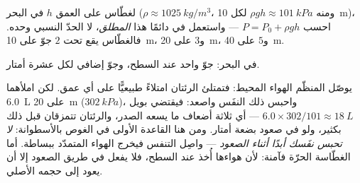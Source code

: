 \begin{method}\label{met:g10:pressure:dive}
لغطّاس على العمق $h$ في البحر ($\rho \approx \qty{1025}{kg/m^3}$،
ومنه $\rho g h \approx \qty{101}{kPa}$ لكل \qty{10}{m})، احسب
$P = P_0 + \rho g h$ --- واستعمل في  دائمًا هذا 
\emph{المطلق}، لا الحدّ النسبي وحده. فالغطّاس يقع
تحت $2$ جوّ على \qty{10}{m}، و$3$ على \qty{20}{m}، و$5$ على
\qty{40}{m}.
\end{method}

\begin{omfigure}

{\small {} في البحر: جوّ واحد عند السطح، وجوّ إضافي لكل عشرة أمتار.}
\end{omfigure}

\begin{remark}\label{rem:g10:pressure:breath}
يوصّل المنظّم الهواء  المحيط: فتمتلئ الرئتان امتلاءً طبيعيًّا على
أي عمق. لكن املأهما \qty{6.0}{L} على \qty{20}{m} ($\qty{302}{kPa}$)،
واحبس ذلك النفَس واصعد: فيقتضي بويل
$6.0 \times 302/101 \approx \qty{18}{L}$ --- أي ثلاثة أضعاف ما يسعه
الصدر، والرئتان تتمزقان قبل ذلك بكثير، ولو في صعود بضعة أمتار.
ومن هنا القاعدة الأولى في الغوص بالأسطوانة: \emph{لا تحبس نفَسك أبدًا أثناء الصعود}
--- واصِل التنفس فيخرج الهواء المتمدّد ببساطة. أما الغطّاسة الحرّة
فآمنة: لأن هواءها أُخذ عند السطح، فلا يفعل في طريق الصعود إلا
أن يعود إلى حجمه الأصلي.
\end{remark}

